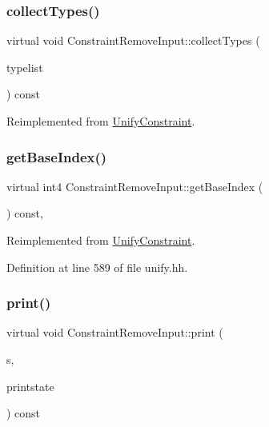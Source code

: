\subsubsection{\texorpdfstring{collectTypes()}{collectTypes()}}
{\footnotesize\ttfamily virtual void Constraint\+Remove\+Input\+::collect\+Types (\begin{DoxyParamCaption}\item[{vector$<$ \mbox{\hyperlink{class_unify_datatype}{Unify\+Datatype}} $>$ \&}]{typelist }\end{DoxyParamCaption}) const\hspace{0.3cm}{\ttfamily [virtual]}}



Reimplemented from \mbox{\hyperlink{class_unify_constraint_acb83b6bea3b21e13054e72ac9cfaba0f}{Unify\+Constraint}}.

\mbox{\label{class_constraint_remove_input_a5e5b7c0b890bd9b8306d7d540cd800c4}} 
\subsubsection{\texorpdfstring{getBaseIndex()}{getBaseIndex()}}
{\footnotesize\ttfamily virtual int4 Constraint\+Remove\+Input\+::get\+Base\+Index (\begin{DoxyParamCaption}\item[{void}]{ }\end{DoxyParamCaption}) const\hspace{0.3cm}{\ttfamily [inline]}, {\ttfamily [virtual]}}



Reimplemented from \mbox{\hyperlink{class_unify_constraint_a44f0164f38ac1fdc44fc73ebe7678de1}{Unify\+Constraint}}.



Definition at line 589 of file unify.\+hh.

\mbox{\label{class_constraint_remove_input_a4fe12c997302e5865584632c1823af00}} 
\subsubsection{\texorpdfstring{print()}{print()}}
{\footnotesize\ttfamily virtual void Constraint\+Remove\+Input\+::print (\begin{DoxyParamCaption}\item[{ostream \&}]{s,  }\item[{\mbox{\hyperlink{class_unify_c_printer}{Unify\+C\+Printer}} \&}]{printstate }\end{DoxyParamCaption}) const\hspace{0.3cm}{\ttfamily [virtual]}}



